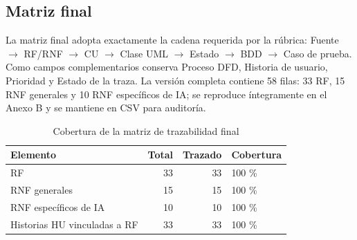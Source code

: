 \documentclass[12pt,a4paper]{article}
\begin{document}
\subsection{Matriz final}
La matriz final adopta exactamente la cadena requerida por la rúbrica: Fuente $\rightarrow$ RF/RNF $\rightarrow$ CU $\rightarrow$ Clase UML $\rightarrow$ Estado $\rightarrow$ BDD $\rightarrow$ Caso de prueba. Como campos complementarios conserva Proceso DFD, Historia de usuario, Prioridad y Estado de la traza. La versión completa contiene 58 filas: 33 RF, 15 RNF generales y 10 RNF específicos de IA; se reproduce íntegramente en el Anexo B y se mantiene en CSV para auditoría.

\begin{table}[H]\centering\caption{Cobertura de la matriz de trazabilidad final}
\begin{tabular}{lrrl}\toprule
\textbf{Elemento}&\textbf{Total}&\textbf{Trazado}&\textbf{Cobertura}\\\midrule
RF&33&33&100 \%\\
RNF generales&15&15&100 \%\\
RNF específicos de IA&10&10&100 \%\\
Historias HU vinculadas a RF&33&33&100 \%\\\bottomrule
\end{tabular}\end{table}
\end{document}
